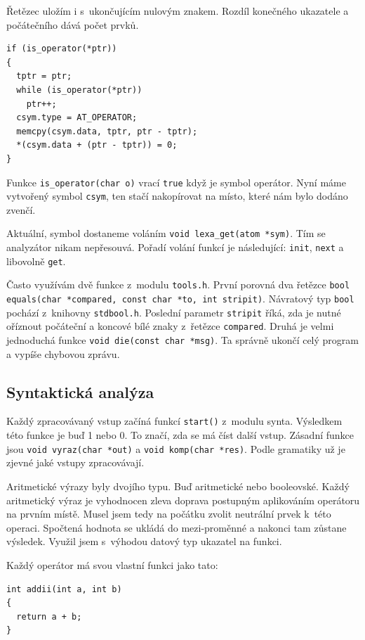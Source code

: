 \documentclass[a4paper, 12pt]{article}
\begin{document}
Řetězec uložím i s~ukončujícím nulovým znakem.  Rozdíl konečného
ukazatele a počátečního dává počet prvků.

\begin{lstlisting}
if (is_operator(*ptr))
{
  tptr = ptr;
  while (is_operator(*ptr))
    ptr++;
  csym.type = AT_OPERATOR;
  memcpy(csym.data, tptr, ptr - tptr);
  *(csym.data + (ptr - tptr)) = 0;
}
\end{lstlisting}

Funkce \texttt{is\_operator(char o)} vrací \texttt{true} když
je symbol operátor. Nyní máme vytvořený symbol \texttt{csym}, ten
stačí nakopírovat na místo, které nám bylo dodáno zvenčí.

Aktuální, symbol dostaneme voláním
\verb+void lexa_get(atom *sym)+. Tím se analyzátor nikam nepřesouvá.
Pořadí volání funkcí je následující: \texttt{init}, \texttt{next} a
libovolně \texttt{get}.

Často využívám dvě funkce z~modulu \texttt{tools.h}. První porovná
dva řetězce
\verb+bool equals(char *compared, const char *to, int stripit)+. Návratový
typ \texttt{bool} pochází z~knihovny \texttt{stdbool.h}.  Poslední
parametr \texttt{stripit} říká, zda je nutné oříznout počáteční a
koncové bílé znaky z~řetězce \texttt{compared}.  Druhá je velmi
jednoduchá funkce \verb+void die(const char *msg)+. Ta správně ukončí celý
program a vypíše chybovou zprávu.

\subsection{Syntaktická analýza}
Každý zpracovávaný vstup začíná funkcí \texttt{start()} z~modulu
\textsf{synta}.  Výsledkem této funkce je buď 1 nebo 0. To značí, zda
se má číst další vstup.  Zásadní funkce jsou
\verb+void vyraz(char *out)+ a \verb+void komp(char *res)+. Podle
gramatiky už je zjevné jaké vstupy zpracovávají.

Aritmetické výrazy byly dvojího typu. Buď aritmetické nebo
booleovské. Každý aritmetický výraz je vyhodnocen zleva doprava
postupným aplikováním operátoru na prvním místě. Musel jsem tedy na
počátku zvolit neutrální prvek k~této operaci. Spočtená hodnota se
ukládá do mezi-proměnné a nakonci tam zůstane výsledek.  Využil jsem
s~výhodou datový typ ukazatel na funkci.

Každý operátor má svou vlastní funkci jako tato:
\begin{lstlisting}
int addii(int a, int b)
{
  return a + b;
}
\end{lstlisting}
\end{document}

